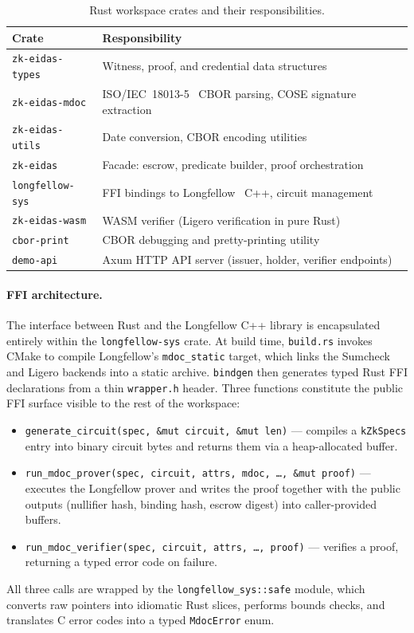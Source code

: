 \begin{table}[t]
  \centering
  \caption{Rust workspace crates and their responsibilities.}\label{tab:crates}
  \begin{tabular}{ll}
    \toprule
    Crate & Responsibility \\
    \midrule
    \texttt{zk-eidas-types}  & Witness, proof, and credential data structures \\
    \texttt{zk-eidas-mdoc}   & ISO/IEC~18013-5~\cite{iso18013} CBOR parsing, COSE signature extraction \\
    \texttt{zk-eidas-utils}  & Date conversion, CBOR encoding utilities \\
    \texttt{zk-eidas}        & Facade: escrow, predicate builder, proof orchestration \\
    \texttt{longfellow-sys}  & FFI bindings to Longfellow~\cite{longfellow} C++, circuit management \\
    \texttt{zk-eidas-wasm}   & WASM verifier (Ligero verification in pure Rust) \\
    \texttt{cbor-print}      & CBOR debugging and pretty-printing utility \\
    \texttt{demo-api}        & Axum HTTP API server (issuer, holder, verifier endpoints) \\
    \bottomrule
  \end{tabular}
\end{table}

\paragraph{FFI architecture.}
The interface between Rust and the Longfellow C++ library is encapsulated entirely within the
\texttt{longfellow-sys} crate.
At build time, \texttt{build.rs} invokes CMake to compile Longfellow's \texttt{mdoc\_static}
target, which links the Sumcheck and Ligero backends into a static archive.
\texttt{bindgen} then generates typed Rust FFI declarations from a thin \texttt{wrapper.h} header.
Three functions constitute the public FFI surface visible to the rest of the workspace:
\begin{itemize}
  \item \texttt{generate\_circuit(spec, \&mut circuit, \&mut len)} --- compiles a \texttt{kZkSpecs}
        entry into binary circuit bytes and returns them via a heap-allocated buffer.
  \item \texttt{run\_mdoc\_prover(spec, circuit, attrs, mdoc, \ldots, \&mut proof)} --- executes
        the Longfellow prover and writes the proof together with the public outputs
        (nullifier hash, binding hash, escrow digest) into caller-provided buffers.
  \item \texttt{run\_mdoc\_verifier(spec, circuit, attrs, \ldots, proof)} --- verifies a proof,
        returning a typed error code on failure.
\end{itemize}
All three calls are wrapped by the \texttt{longfellow\_sys::safe} module, which converts raw
pointers into idiomatic Rust slices, performs bounds checks, and translates C error codes into
a typed \texttt{MdocError} enum.

